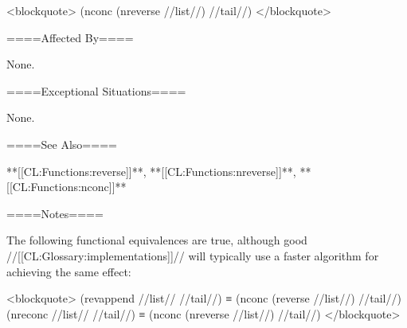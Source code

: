 <blockquote> (nconc (nreverse //list//) //tail//) </blockquote>

====Affected By====

None.

====Exceptional Situations====

None.

====See Also====

**[[CL:Functions:reverse]]**, **[[CL:Functions:nreverse]]**, **[[CL:Functions:nconc]]**

====Notes====

The following functional equivalences are true, although good //[[CL:Glossary:implementations]]// will typically use a faster algorithm for achieving the same effect:

<blockquote> (revappend //list// //tail//) ≡ (nconc (reverse //list//) //tail//) (nreconc //list// //tail//) ≡ (nconc (nreverse //list//) //tail//) </blockquote>

 
